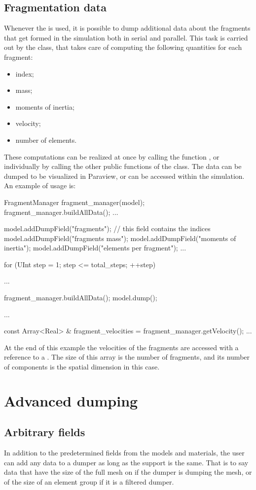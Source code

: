 \subsection{Fragmentation data}

Whenever the  is used, it is
possible to dump additional data about the fragments that get formed
in the simulation both in serial and parallel. This task is carried
out by the  class, that takes care of computing
the following quantities for each fragment:
\begin{itemize}
\item index;
\item mass;
\item moments of inertia;
\item velocity;
\item number of elements.
\end{itemize}
These computations can be realized at once by calling the function
, or individually by calling the other public
functions of the class. The data can be dumped to be visualized in
Paraview, or can be accessed within the simulation. An example of
usage is:
\begin{cpp}
  FragmentManager fragment_manager(model);
  fragment_manager.buildAllData();
  ...

  model.addDumpField("fragments");       // this field contains the indices
  model.addDumpField("fragments mass");
  model.addDumpField("moments of inertia");
  model.addDumpField("elements per fragment");
  ...

  for (UInt step = 1; step <= total_steps; ++step) {
    ...

    fragment_manager.buildAllData();
    model.dump();
  }
  ...

  const Array<Real> & fragment_velocities = fragment_manager.getVelocity();
  ...
\end{cpp}
At the end of this example the velocities of the fragments are
accessed with a reference to a . The size of
this array is the number of fragments, and its number of components is
the spatial dimension in this case.


\section{Advanced dumping}

\subsection{Arbitrary fields}
In addition to the predetermined fields from the models and materials, the user
can add any data to a dumper as long as the support is the same. That is to say
data that have the size of the full mesh on if the dumper is dumping the mesh,
or of the size of an element group if it is a filtered dumper.

